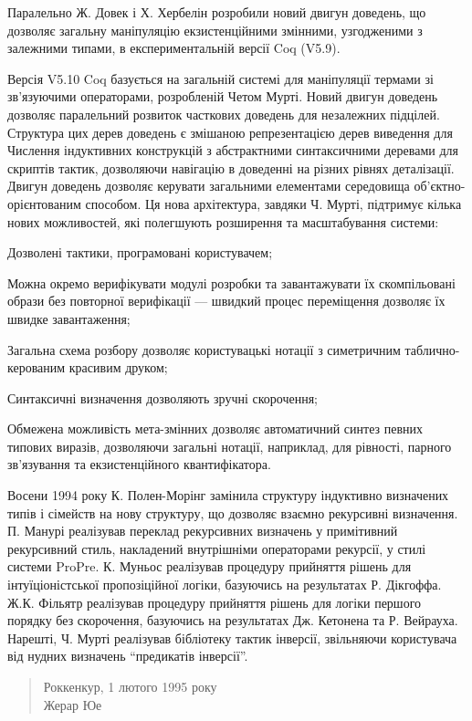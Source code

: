 \documentclass{article}
\begin{document}
Паралельно Ж. Довек і Х. Хербелін розробили новий двигун доведень, що дозволяє загальну маніпуляцію екзистенційними змінними, узгодженими з залежними типами, в експериментальній версії Coq (V5.9).

Версія V5.10 Coq базується на загальній системі для маніпуляції термами зі зв’язуючими операторами, розробленій Четом Мурті. Новий двигун доведень дозволяє паралельний розвиток часткових доведень для незалежних підцілей. Структура цих дерев доведень є змішаною репрезентацією дерев виведення для Числення індуктивних конструкцій з абстрактними синтаксичними деревами для скриптів тактик, дозволяючи навігацію в доведенні на різних рівнях деталізації. Двигун доведень дозволяє керувати загальними елементами середовища об’єктно-орієнтованим способом. Ця нова архітектура, завдяки Ч. Мурті, підтримує кілька нових можливостей, які полегшують розширення та масштабування системи:

Дозволені тактики, програмовані користувачем;

Можна окремо верифікувати модулі розробки та завантажувати їх скомпільовані образи без повторної верифікації — швидкий процес переміщення дозволяє їх швидке завантаження;

Загальна схема розбору дозволяє користувацькі нотації з симетричним таблично-керованим красивим друком;

Синтаксичні визначення дозволяють зручні скорочення;

Обмежена можливість мета-змінних дозволяє автоматичний синтез певних типових виразів, дозволяючи загальні нотації, наприклад, для рівності, парного зв’язування та екзистенційного квантифікатора.

Восени 1994 року К. Полен-Морінг замінила структуру індуктивно визначених типів і сімейств на нову структуру, що дозволяє взаємно рекурсивні визначення. П. Манурі реалізував переклад рекурсивних визначень у примітивний рекурсивний стиль, накладений внутрішніми операторами рекурсії, у стилі системи ProPre. К. Муньос реалізував процедуру прийняття рішень для інтуїціоністської пропозіційної логіки, базуючись на результатах Р. Дікгоффа. Ж.К. Фільятр реалізував процедуру прийняття рішень для логіки першого порядку без скорочення, базуючись на результатах Дж. Кетонена та Р. Вейрауха. Нарешті, Ч. Мурті реалізував бібліотеку тактик інверсії, звільняючи користувача від нудних визначень “предикатів інверсії”.

\begin{quote}
Роккенкур, 1 лютого 1995 року \\
Жерар Юе
\end{quote}
\end{document}
